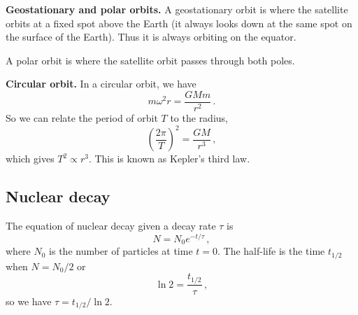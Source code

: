 \documentclass{article}
\begin{document}
\textbf{Geostationary and polar orbits.} A geostationary orbit is where the satellite orbits at a fixed spot above the Earth (it always looks down at the same spot on the surface of the Earth). Thus it is always orbiting on the equator.

A polar orbit is where the satellite orbit passes through both poles.

\textbf{Circular orbit.} In a circular orbit, we have
\[
m\omega^2r=\frac{GMm}{r^2}\,.
\]
So we can relate the period of orbit $T$ to the radius,
\[
\left(\frac{2\pi}{T}\right)^2=\frac{GM}{r^3}\,,
\]
which gives $T^2\propto r^3$. This is known as Kepler's third law.

\subsection{Nuclear decay}
The equation of nuclear decay given a decay rate $\tau$ is
\[
N=N_0e^{-t/\tau}\,,
\]
where $N_0$ is the number of particles at time $t=0$. The half-life is the time $t_{1/2}$ when $N=N_0/2$ or
\[
\ln 2=\frac{t_{1/2}}{\tau}\,,
\]
so we have $\tau=t_{1/2}/\ln 2$.
\end{document}

